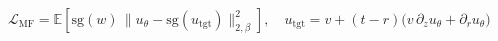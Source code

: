 \documentclass[border=10pt,varwidth=\maxdimen]{standalone}
\begin{document}
\(\displaystyle \mathcal{L}_{\mathrm{MF}} = \mathbb{E}\!\left[\mathrm{sg}(w)\,\big\lVert u_\theta - \mathrm{sg}(u_{\mathrm{tgt}})\big\rVert_{2,\beta}^2\right],\quad u_{\mathrm{tgt}} = v + (t-r)\big(v\,\partial_z u_\theta + \partial_r u_\theta\big) \)
\end{document}
